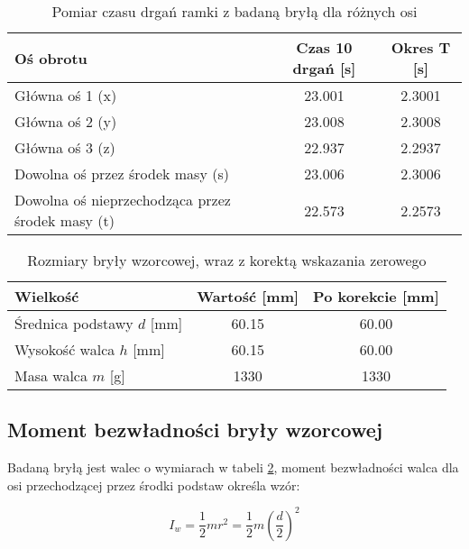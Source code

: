 \documentclass[a4paper,12pt]{article}
\begin{document}
\begin{table}[H]
    \centering
    \begin{tabular}{|l|c|c|}
        \hline
        \textbf{Oś obrotu} & \textbf{Czas 10 drgań [s]} & \textbf{Okres T [s]} \\
        \hline
        Główna oś 1 (x) & 23.001 & 2.3001 \\
        \hline
        Główna oś 2 (y) & 23.008 & 2.3008 \\
        \hline
        Główna oś 3 (z) & 22.937 & 2.2937 \\
        \hline
        Dowolna oś przez środek masy (s) & 23.006 & 2.3006 \\
        \hline
        Dowolna oś nieprzechodząca przez środek masy (t) & 22.573 & 2.2573 \\
        \hline
    \end{tabular}
    \caption{Pomiar czasu drgań ramki z badaną bryłą dla różnych osi}
    \label{tab:pomiar_czasu_drgan_badanej_bryly}
\end{table}

\begin{table}[H]
    \centering
    \begin{tabular}{|l|c|c|}
        \hline
        \textbf{Wielkość} & \textbf{Wartość [mm]} & \textbf{Po korekcie [mm]} \\
        \hline
        Średnica podstawy $d$ [mm] & 60.15 & 60.00 \\
        \hline
        Wysokość walca $h$ [mm] & 60.15 & 60.00\\
        \hline
        Masa walca $m$ [g] & 1330 & 1330 \\
        \hline
    \end{tabular}
    \caption{Rozmiary bryły wzorcowej, wraz z korektą wskazania zerowego}
    \label{tab:rozmiar_bryly_wzorcowej}
\end{table}

\subsection{Moment bezwładności bryły wzorcowej}

Badaną bryłą jest walec o wymiarach w tabeli \ref{tab:rozmiar_bryly_wzorcowej}, moment bezwładności walca dla osi przechodzącej przez środki podstaw określa wzór:

\begin{equation} \label{eq:moment_bezwladnosci_walca}
    I_w = \frac{1}{2}mr^2 = \frac{1}{2}m\left(\frac{d}{2}\right)^2
\end{equation}
\end{document}
